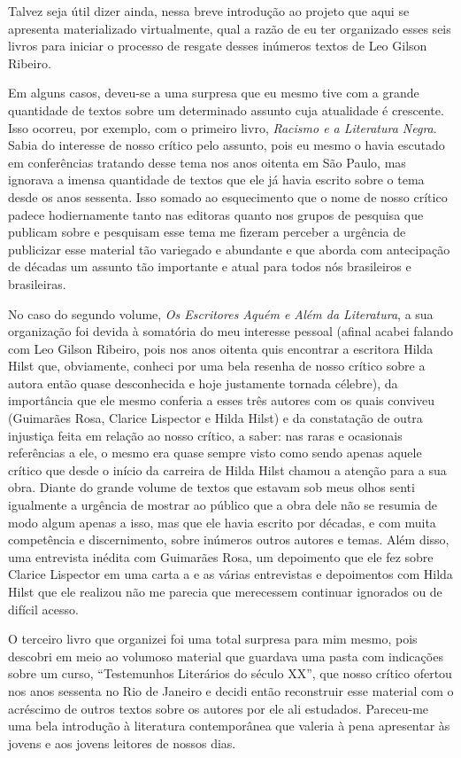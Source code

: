 Talvez seja útil dizer ainda, nessa breve introdução ao projeto que aqui
se apresenta materializado virtualmente, qual a razão de eu ter
organizado esses seis livros para iniciar o processo de resgate desses
inúmeros textos de Leo Gilson Ribeiro.

Em alguns casos, deveu-se a uma surpresa que eu mesmo tive com a grande
quantidade de textos sobre um determinado assunto cuja atualidade é
crescente. Isso ocorreu, por exemplo, com o primeiro livro,
\emph{Racismo e a Literatura Negra}. Sabia do interesse de nosso crítico
pelo assunto, pois eu mesmo o havia escutado em conferências tratando
desse tema nos anos oitenta em São Paulo, mas ignorava a imensa
quantidade de textos que ele já havia escrito sobre o tema desde os anos
sessenta. Isso somado ao esquecimento que o nome de nosso crítico padece
hodiernamente tanto nas editoras quanto nos grupos de pesquisa que
publicam sobre e pesquisam esse tema me fizeram perceber a urgência de
publicizar esse material tão variegado e abundante e que aborda com
antecipação de décadas um assunto tão importante e atual para todos nós
brasileiros e brasileiras.

No caso do segundo volume, \emph{Os Escritores Aquém e Além da
Literatura}, a sua organização foi devida à somatória do meu interesse
pessoal (afinal acabei falando com Leo Gilson Ribeiro, pois nos anos
oitenta quis encontrar a escritora Hilda Hilst que, obviamente, conheci
por uma bela resenha de nosso crítico sobre a autora então quase
desconhecida e hoje justamente tornada célebre), da importância que ele
mesmo conferia a esses três autores com os quais conviveu (Guimarães
Rosa, Clarice Lispector e Hilda Hilst) e da constatação de outra
injustiça feita em relação ao nosso crítico, a saber: nas raras e
ocasionais referências a ele, o mesmo era quase sempre visto como sendo
apenas aquele crítico que desde o início da carreira de Hilda Hilst
chamou a atenção para a sua obra. Diante do grande volume de textos que
estavam sob meus olhos senti igualmente a urgência de mostrar ao público
que a obra dele não se resumia de modo algum apenas a isso, mas que ele
havia escrito por décadas, e com muita competência e discernimento,
sobre inúmeros outros autores e temas. Além disso, uma entrevista
inédita com Guimarães Rosa, um depoimento que ele fez sobre Clarice
Lispector em uma carta a e as várias entrevistas e depoimentos com Hilda
Hilst que ele realizou não me parecia que merecessem continuar ignorados
ou de difícil acesso.

O terceiro livro que organizei foi uma total surpresa para mim mesmo,
pois descobri em meio ao volumoso material que guardava uma pasta com
indicações sobre um curso, ``Testemunhos Literários do século XX'', que
nosso crítico ofertou nos anos sessenta no Rio de Janeiro e decidi então
reconstruir esse material com o acréscimo de outros textos sobre os
autores por ele ali estudados. Pareceu-me uma bela introdução à
literatura contemporânea que valeria à pena apresentar às jovens e aos
jovens leitores de nossos dias.


